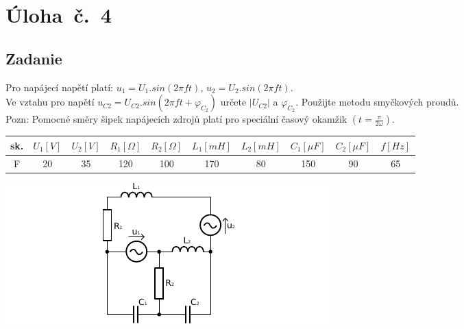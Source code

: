 \section{Úloha~č.~4}
\subsection{Zadanie}
Pro napájecí napětí platí: $u_1 = U_1 . sin(2 \pi ft)$, $u_2 = U_2 . sin(2 \pi ft)$. \\
Ve vztahu pro napětí $u_{C2} = U_{C2} . sin(2 \pi ft +  \varphi_{C_2})$ určete $|U_{C2}|$ a $\varphi_{C_2}$. Použijte
metodu smyčkových proudů. 
\bigskip \\
Pozn: Pomocné směry šipek napájecích zdrojů platí pro speciální časový okamžik $\left(t = \frac{\pi}{2 \omega}\right)$.
\begin{table}[H]
\begin{center}
  \begin{tabular}{|c|c|c|c|c|c|c|c|c|c|}
    \hline
    sk. &  $U_1 [V]$ &  $U_2 [V]$ &  $R_{1} [\Omega]$ &  $R_{2} [\Omega]$ &  $L_{1} [mH]$ &  $L_{2} [mH]$ &  $C_{1} [\mu F]$ &  $C_{2} [\mu F]$ & $f [Hz]$ \\ \hline
    F & 20 & 35 & 120 & 100 & 170 & 80 & 150 & 90 & 65 \\ \hline
  \end{tabular}
\end{center}
\end{table}
\begin{center}
  \includegraphics[width=0.8\columnwidth,keepaspectratio]{res/u4o1}
\end{center}
